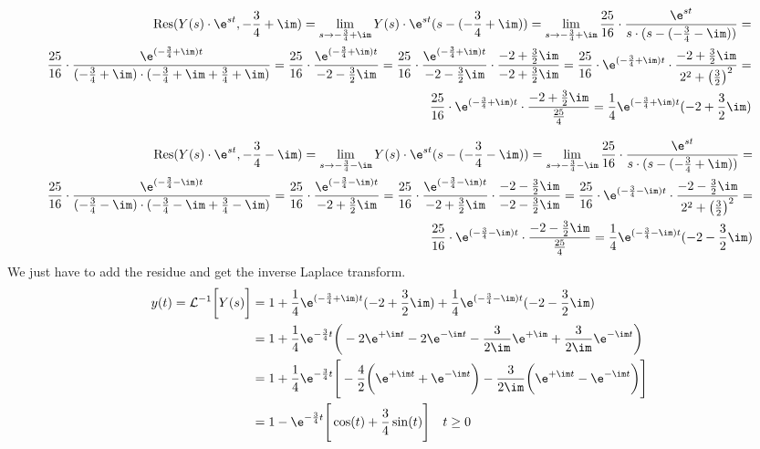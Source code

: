\begin{align}
	\mathrm{Res}(Y(s)\cdot\e^{st},-\frac{3}{4}+\im)=\lim\limits_{s\rightarrow -\frac{3}{4}+\im}Y(s)\cdot\e^{st}(s-(-\frac{3}{4}+\im))=\lim\limits_{s\rightarrow -\frac{3}{4}+\im}\frac{25}{16}\cdot\frac{\e^{st}}{s\cdot(s-(-\frac{3}{4}-\im))} = \nonumber \\
	\frac{25}{16}\cdot\frac{\e^{(-\frac{3}{4}+\im)t}}{(-\frac{3}{4}+\im)\cdot(-\frac{3}{4}+\im+\frac{3}{4}+\im)}=\frac{25}{16}\cdot\frac{\e^{(-\frac{3}{4}+\im)t}}{-2-\frac{3}{2}\im}=\frac{25}{16}\cdot\frac{\e^{(-\frac{3}{4}+\im)t}}{-2-\frac{3}{2}\im}\cdot\frac{-2+\frac{3}{2}\im}{-2+\frac{3}{2}\im}=\frac{25}{16}\cdot\e^{(-\frac{3}{4}+\im)t}\cdot\frac{-2+\frac{3}{2}\im}{2^2+\big (\frac{3}{2}\big)^2}=\nonumber \\
	\frac{25}{16}\cdot\e^{(-\frac{3}{4}+\im)t}\cdot\frac{-2+\frac{3}{2}\im}{\frac{25}{4}}=\frac{1}{4}\e^{(-\frac{3}{4}+\im)t}(-2+\frac{3}{2}\im)
\end{align}

\begin{align}
	\mathrm{Res}(Y(s)\cdot\e^{st},-\frac{3}{4}-\im)=\lim\limits_{s\rightarrow -\frac{3}{4}-\im}Y(s)\cdot\e^{st}(s-(-\frac{3}{4}-\im))=\lim\limits_{s\rightarrow -\frac{3}{4}-\im}\frac{25}{16}\cdot\frac{\e^{st}}{s\cdot(s-(-\frac{3}{4}+\im))} = \nonumber \\
\frac{25}{16}\cdot\frac{\e^{(-\frac{3}{4}-\im)t}}{(-\frac{3}{4}-\im)\cdot(-\frac{3}{4}-\im+\frac{3}{4}-\im)}=\frac{25}{16}\cdot\frac{\e^{(-\frac{3}{4}-\im)t}}{-2+\frac{3}{2}\im}=\frac{25}{16}\cdot\frac{\e^{(-\frac{3}{4}-\im)t}}{-2+\frac{3}{2}\im}\cdot\frac{-2-\frac{3}{2}\im}{-2-\frac{3}{2}\im}=\frac{25}{16}\cdot\e^{(-\frac{3}{4}-\im)t}\cdot\frac{-2-\frac{3}{2}\im}{2^2+\big (\frac{3}{2}\big)^2}=\nonumber \\
\frac{25}{16}\cdot\e^{(-\frac{3}{4}-\im)t}\cdot\frac{-2-\frac{3}{2}\im}{\frac{25}{4}}=\frac{1}{4}\e^{(-\frac{3}{4}-\im)t}(-2-\frac{3}{2}\im)
\end{align}
We just have to add the residue and get the inverse Laplace transform.
\begin{align}
	y(t) = \mathcal{L}^{-1}\bigg [Y(s) \bigg]&=1+\frac{1}{4}\e^{(-\frac{3}{4}+\im)t}(-2+\frac{3}{2}\im)+\frac{1}{4}\e^{(-\frac{3}{4}-\im)t}(-2-\frac{3}{2}\im)\nonumber \\
	&=1+\frac{1}{4}\e^{-\frac{3}{4}t}\bigg (-2\e^{+\im t}-2\e^{-\im t}-\frac{3}{2\im}\e^{+\im}+\frac{3}{2\im}\e^{-\im t}\bigg )\nonumber \\
	&= 1+\frac{1}{4}\e^{-\frac{3}{4}t}\Bigg [-\frac{4}{2}\bigg (\e^{+\im t}+\e^{-\im t}\bigg )-\frac{3}{2\im}\bigg (\e^{+\im t}-\e^{-\im t} \bigg )\Bigg ] \nonumber \\
	&=1-\e^{-\frac{3}{4}t}\Bigg [\cos(t)+\frac{3}{4}\sin(t) \Bigg ] \quad t \geq 0
\end{align}
